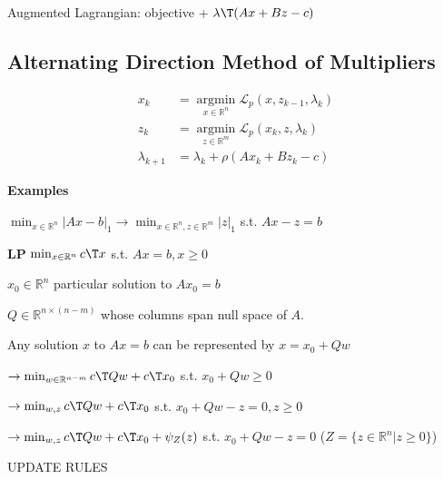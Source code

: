 Augmented Lagrangian: objective +
$\lambda\T(Ax+Bz-c)$

\subsection{Alternating Direction Method  of Multipliers}

$$\begin{aligned}
		x_k           & =\underset{x \in \mathbb{R}^{n} }{\operatorname{argmin}}\mathcal{L}_p(x,z_{k-1},\lambda_k)
		\\
		z_k           & =\underset{z \in \mathbb{R}^{m} }{\operatorname{argmin}}\mathcal{L}_p(x_k,z,\lambda_k)
		\\
		\lambda_{k+1} & =\lambda_k+\rho(Ax_k+Bz_k-c)
	\end{aligned}$$

\textbf{Examples}

$\min_{x\in\mathbb{R}^{n}}|Ax-b|_1
	\rightarrow
	\min_{x\in\mathbb{R}^{n}, z\in\mathbb{R}^{m}}|z|_1$
s.t. $Ax-z=b$

\textbf{LP}
$\min_{x\in\mathbb{R}^{n}}c\T x$
s.t. $Ax=b, x\ge0$

$x_0\in\mathbb{R}^{n}$
particular solution to
$Ax_0=b$

$Q\in\mathbb{R}^{n\times(n-m)}$
whose columns span null space of $A$.

Any solution $x$ to $Ax=b$
can be represented by
$x=x_0+Qw$

$\rightarrow
	\min_{w\in\mathbb{R}^{n-m}}c\T Qw+c\T x_0$
s.t. $x_0+Qw\ge0$

$\rightarrow
	\min_{w,z}c\T Qw+c\T x_0$
s.t. $x_0+Qw-z=0, z\ge0$

$\rightarrow
	\min_{w,z}c\T Qw+c\T x_0+\psi_Z(z)$
s.t. $x_0+Qw-z=0$
($Z=\{z\in\mathbb{R}^{n}|z\ge0\}$)

UPDATE RULES

